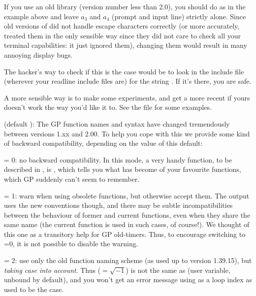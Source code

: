 
If you use an old  library (version number less than 2.0),
you should do as in the example above and leave $a_3$ and $a_4$ (prompt
and input line) strictly alone. Since old versions of  did
not handle escape characters correctly (or more accurately, treated them
in the only sensible way since they did not care to check all your terminal
capabilities: it just ignored them), changing them would result in many
annoying display bugs.

The hacker's way to check if this is the case would be to look in the
 include file (wherever your readline include files are) for
the string . If it's there, you are safe.

A more sensible way is to make some experiments, and get a more recent
 if yours doesn't work the way you'd like it to. See the file
 for some examples.

 (default ): The GP function names and syntax
have changed tremendously between versions 1.xx and 2.00. To help you cope
with this we provide some kind of backward compatibility, depending on the
value of this default:

\quad {} = 0: no backward compatibility. In this mode, a very
handy function, to be described in , is ,
which tells you what has become of your favourite functions, which GP
suddenly can't seem to remember.

\quad {} = 1: warn when using obsolete functions, but
otherwise accept them. The output uses the new conventions though, and
there may be subtle incompatibilities between the behaviour of former and
current functions, even when they share the same name (the current function
is used in such cases, of course!). We thought of this one as a transitory
help for GP old-timers. Thus, to encourage switching to =0,
it is not possible to disable the warning.

\quad {} = 2: use only the old function naming scheme (as
used up to version 1.39.15), but {\it taking case into account}. Thus
 (${}=\sqrt{-1}$) is not the same as  (user variable, unbound
by default), and you won't get an error message using  as a loop
index as used to be the case.

